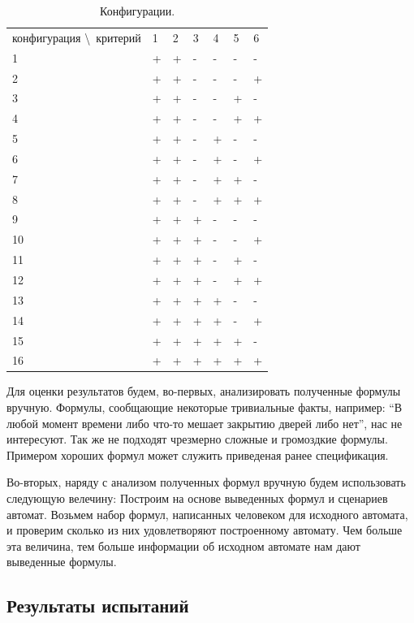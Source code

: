 \documentclass[12pt,fleqn]{article}
\begin{document}
\begin{table}
\centering
\begin{tabular}{ l | l | l | l | l | l | l }
конфигурация \textbackslash \ критерий & 1 & 2 & 3 & 4 & 5 & 6 \\
1  & + & + & - & - & - & - \\
2  & + & + & - & - & - & + \\
3  & + & + & - & - & + & - \\
4  & + & + & - & - & + & + \\
5  & + & + & - & + & - & - \\
6  & + & + & - & + & - & + \\
7  & + & + & - & + & + & - \\
8  & + & + & - & + & + & + \\
9  & + & + & + & - & - & - \\
10 & + & + & + & - & - & + \\
11 & + & + & + & - & + & - \\
12 & + & + & + & - & + & + \\
13 & + & + & + & + & - & - \\
14 & + & + & + & + & - & + \\
15 & + & + & + & + & + & - \\
16 & + & + & + & + & + & + \\
\end{tabular}
\caption{Конфигурации.}
\end{table}

Для оценки результатов будем, во-первых, анализировать полученные формулы вручную. Формулы, сообщающие некоторые тривиальные
факты, например: ``В любой момент времени либо что-то мешает закрытию дверей либо нет'', нас не интересуют.
Так же не подходят чрезмерно сложные и громоздкие формулы. Примером хороших формул может служить приведеная ранее спецификация.

Во-вторых, наряду с анализом полученных формул вручную будем использовать следующую велечину:
Построим на основе выведенных формул и сценариев автомат. Возьмем набор формул, написанных человеком для исходного автомата, и
проверим сколько из них удовлетворяют построенному автомату. Чем больше эта величина, тем больше информации об исходном
автомате нам дают выведенные формулы.

\subsection*{Результаты испытаний}
\end{document}
